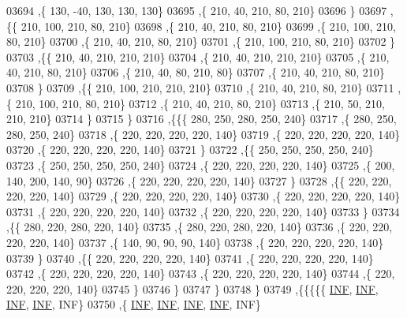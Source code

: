 \begin{DoxyCode}
03694     ,\{   130,   -40,   130,   130,   130\}
03695     ,\{   210,    40,   210,    80,   210\}
03696     \}
03697    ,\{\{   210,   100,   210,    80,   210\}
03698     ,\{   210,    40,   210,    80,   210\}
03699     ,\{   210,   100,   210,    80,   210\}
03700     ,\{   210,    40,   210,    80,   210\}
03701     ,\{   210,   100,   210,    80,   210\}
03702     \}
03703    ,\{\{   210,    40,   210,   210,   210\}
03704     ,\{   210,    40,   210,   210,   210\}
03705     ,\{   210,    40,   210,    80,   210\}
03706     ,\{   210,    40,    80,   210,    80\}
03707     ,\{   210,    40,   210,    80,   210\}
03708     \}
03709    ,\{\{   210,   100,   210,   210,   210\}
03710     ,\{   210,    40,   210,    80,   210\}
03711     ,\{   210,   100,   210,    80,   210\}
03712     ,\{   210,    40,   210,    80,   210\}
03713     ,\{   210,    50,   210,   210,   210\}
03714     \}
03715    \}
03716   ,\{\{\{   280,   250,   280,   250,   240\}
03717     ,\{   280,   250,   280,   250,   240\}
03718     ,\{   220,   220,   220,   220,   140\}
03719     ,\{   220,   220,   220,   220,   140\}
03720     ,\{   220,   220,   220,   220,   140\}
03721     \}
03722    ,\{\{   250,   250,   250,   250,   240\}
03723     ,\{   250,   250,   250,   250,   240\}
03724     ,\{   220,   220,   220,   220,   140\}
03725     ,\{   200,   140,   200,   140,    90\}
03726     ,\{   220,   220,   220,   220,   140\}
03727     \}
03728    ,\{\{   220,   220,   220,   220,   140\}
03729     ,\{   220,   220,   220,   220,   140\}
03730     ,\{   220,   220,   220,   220,   140\}
03731     ,\{   220,   220,   220,   220,   140\}
03732     ,\{   220,   220,   220,   220,   140\}
03733     \}
03734    ,\{\{   280,   220,   280,   220,   140\}
03735     ,\{   280,   220,   280,   220,   140\}
03736     ,\{   220,   220,   220,   220,   140\}
03737     ,\{   140,    90,    90,    90,   140\}
03738     ,\{   220,   220,   220,   220,   140\}
03739     \}
03740    ,\{\{   220,   220,   220,   220,   140\}
03741     ,\{   220,   220,   220,   220,   140\}
03742     ,\{   220,   220,   220,   220,   140\}
03743     ,\{   220,   220,   220,   220,   140\}
03744     ,\{   220,   220,   220,   220,   140\}
03745     \}
03746    \}
03747   \}
03748  \}
03749 ,\{\{\{\{\{   \hyperlink{energy__const_8h_a12c2040f25d8e3a7b9e1c2024c618cb6}{INF},   \hyperlink{energy__const_8h_a12c2040f25d8e3a7b9e1c2024c618cb6}{INF},   \hyperlink{energy__const_8h_a12c2040f25d8e3a7b9e1c2024c618cb6}{INF},   \hyperlink{energy__const_8h_a12c2040f25d8e3a7b9e1c2024c618cb6}{INF},   INF\}
03750     ,\{   \hyperlink{energy__const_8h_a12c2040f25d8e3a7b9e1c2024c618cb6}{INF},   \hyperlink{energy__const_8h_a12c2040f25d8e3a7b9e1c2024c618cb6}{INF},   \hyperlink{energy__const_8h_a12c2040f25d8e3a7b9e1c2024c618cb6}{INF},   \hyperlink{energy__const_8h_a12c2040f25d8e3a7b9e1c2024c618cb6}{INF},   INF\}

\end{DoxyCode}

